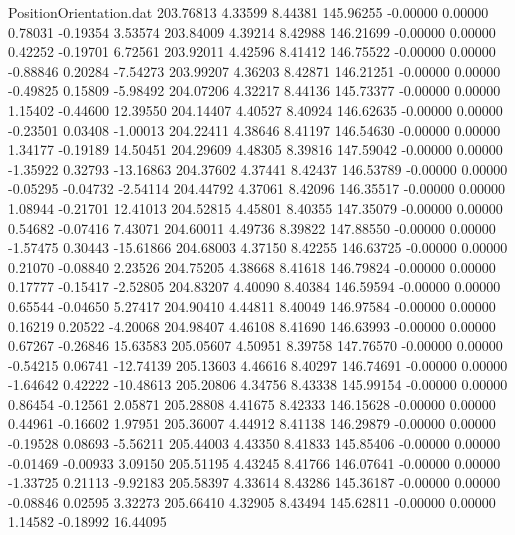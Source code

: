 \begin{filecontents}{PositionOrientation.dat}
 203.76813    4.33599    8.44381   145.96255   -0.00000    0.00000    0.78031   -0.19354    3.53574
 203.84009    4.39214    8.42988   146.21699   -0.00000    0.00000    0.42252   -0.19701    6.72561
 203.92011    4.42596    8.41412   146.75522   -0.00000    0.00000   -0.88846    0.20284   -7.54273
 203.99207    4.36203    8.42871   146.21251   -0.00000    0.00000   -0.49825    0.15809   -5.98492
 204.07206    4.32217    8.44136   145.73377   -0.00000    0.00000    1.15402   -0.44600   12.39550
 204.14407    4.40527    8.40924   146.62635   -0.00000    0.00000   -0.23501    0.03408   -1.00013
 204.22411    4.38646    8.41197   146.54630   -0.00000    0.00000    1.34177   -0.19189   14.50451
 204.29609    4.48305    8.39816   147.59042   -0.00000    0.00000   -1.35922    0.32793  -13.16863
 204.37602    4.37441    8.42437   146.53789   -0.00000    0.00000   -0.05295   -0.04732   -2.54114
 204.44792    4.37061    8.42096   146.35517   -0.00000    0.00000    1.08944   -0.21701   12.41013
 204.52815    4.45801    8.40355   147.35079   -0.00000    0.00000    0.54682   -0.07416    7.43071
 204.60011    4.49736    8.39822   147.88550   -0.00000    0.00000   -1.57475    0.30443  -15.61866
 204.68003    4.37150    8.42255   146.63725   -0.00000    0.00000    0.21070   -0.08840    2.23526
 204.75205    4.38668    8.41618   146.79824   -0.00000    0.00000    0.17777   -0.15417   -2.52805
 204.83207    4.40090    8.40384   146.59594   -0.00000    0.00000    0.65544   -0.04650    5.27417
 204.90410    4.44811    8.40049   146.97584   -0.00000    0.00000    0.16219    0.20522   -4.20068
 204.98407    4.46108    8.41690   146.63993   -0.00000    0.00000    0.67267   -0.26846   15.63583
 205.05607    4.50951    8.39758   147.76570   -0.00000    0.00000   -0.54215    0.06741  -12.74139
 205.13603    4.46616    8.40297   146.74691   -0.00000    0.00000   -1.64642    0.42222  -10.48613
 205.20806    4.34756    8.43338   145.99154   -0.00000    0.00000    0.86454   -0.12561    2.05871
 205.28808    4.41675    8.42333   146.15628   -0.00000    0.00000    0.44961   -0.16602    1.97951
 205.36007    4.44912    8.41138   146.29879   -0.00000    0.00000   -0.19528    0.08693   -5.56211
 205.44003    4.43350    8.41833   145.85406   -0.00000    0.00000   -0.01469   -0.00933    3.09150
 205.51195    4.43245    8.41766   146.07641   -0.00000    0.00000   -1.33725    0.21113   -9.92183
 205.58397    4.33614    8.43286   145.36187   -0.00000    0.00000   -0.08846    0.02595    3.32273
 205.66410    4.32905    8.43494   145.62811   -0.00000    0.00000    1.14582   -0.18992   16.44095

\end{filecontents}
